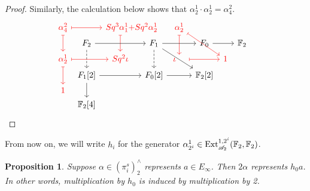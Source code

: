 \documentclass[11pt, titlepage]{article} %
\def\bb{\ensuremath\mathbb}
\def\A{\ensuremath{\mathscr{A}_2}}
\DeclareMathOperator{\Ext}{Ext}
\def\textcolour{\textcolor}
\numberwithin{equation}{subsection}
\theoremstyle{plain}
\newtheorem{proposition}[theorem]{Proposition}
\theoremstyle{definition}
\begin{document}
\begin{proof}
Similarly, the calculation below shows that \(\alpha^1_2\cdot \alpha^1_2=\alpha^2_4\).
\[\begin{tikzcd}[row sep = 0.5ex, column sep=0.8ex]
\textcolour{red}{\alpha^2_4} \arrow[rr, "", mapsto, red] \arrow[dd, swap, "", red, mapsto]  & & \textcolour{red}{Sq^3\alpha^1_1}\textcolour{red}{+}\mathrlap{\textcolour{red}{Sq^2\alpha^1_2}}  \arrow[dd, ""', red, mapsto] & & \textcolour{red}{\alpha^{1}_{2}}  \arrow[dd, ""', red, mapsto] \arrow[rrdd, "", red, mapsto] & && \\
& F_2 \arrow[rr, swap, ""] \arrow[dd, ""', dashrightarrow] & & F_{1} \arrow[dd, ""', dashrightarrow] \arrow[rr, ""'] \arrow[rrdd] & & F_0 \arrow[rr] && \bb{F}_2 \\
\textcolour{red}{\alpha^1_2} \arrow[rr, swap, "", red, mapsto] \arrow[dd, ""', red, mapsto] & & \textcolour{red}{Sq^2\iota} & & \textcolour{red}{\iota}\;\;\;\; \arrow[rr, ""', red, mapsto] & & \textcolour{red}{1} & & & \\
& F_1[2] \arrow[rr, swap, ""] \arrow[dd, ""'] & & F_0[2] \arrow[rr, ""'] & & \bb{F}_2[2] & &\\
\textcolour{red}{1} & &&&&&&\\
& \bb{F}_2[4] &&&&&&
\end{tikzcd}\]
\end{proof}

From now on, we will write \(h_i\) for the generator \(\alpha^1_{2^i}\in \Ext^{1, 2^i}_{\A}(\bb{F}_2, \bb{F}_2)\).

\begin{proposition}
Suppose \(\alpha \in (\pi_i^s)^\wedge_2\) represents \(a \in E_\infty\). Then \(2\alpha\) represents \(h_0a\). In other words, multiplication by \(h_0\) is induced by multiplication by 2. 
\end{proposition}
\end{document}
